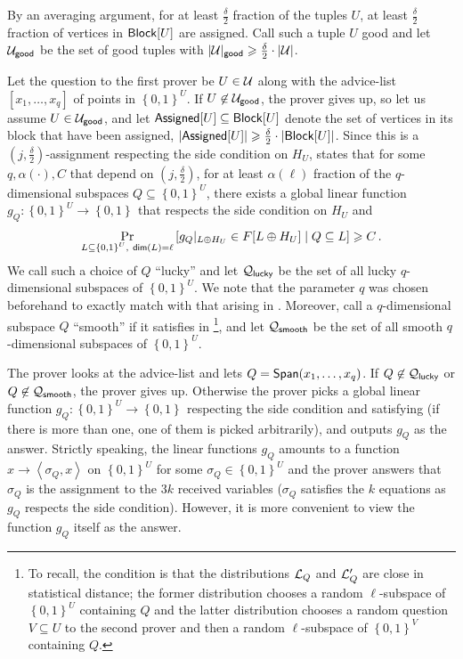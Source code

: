 \documentclass{toc}
\newcommand\set[1]{{\left\{ #1 \right\}}}
\newcommand\Prob[2]{{\Pr_{#1}\left[ {#2} \right]}}
\newcommand\power[1]{\set{0,1}^{#1}}
\newcommand*\xor{\mathbin{\oplus}}
\renewcommand\geq{\geqslant}
\begin{document}
By an averaging argument, for at least $\frac{\delta}{2}$ fraction of the tuples $U$,
at least $\frac{\delta}{2}$ fraction of vertices in ${\sf Block}[U]$ are assigned. Call such a tuple $U$ good and let ${\cal U}_{\sf good}$ be
the set of good tuples with $|{\cal U}|_{\sf good} \geq \frac{\delta}{2} \cdot |{\cal U}|$.

Let the question to the first prover be $U \in {\cal U}$ along with the advice-list  $[x_1, \ldots, x_q]$ of points in $\power{U}$. If
$U \not\in {\cal U}_{\sf good}$, the prover gives up, so let us assume $U \in {\cal U}_{\sf good}$, and
let ${\sf Assigned}[U] \subseteq {\sf Block}[U]$ denote the set of vertices in its block that have been assigned,
$|{\sf Assigned}[U]| \geq \frac{\delta}{2} \cdot |{\sf Block}[U]|$. Since this is a $(j,\frac{\delta}{2})$-assignment respecting the
side condition on $H_U$,  states that for some $q, \alpha(\cdot), C$ that depend on $(j,\frac{\delta}{2})$, for
at least $\alpha(\ell)$ fraction of the $q$-dimensional subspaces $Q \subseteq \power{U}$,
there exists a global linear
function $g_Q : \power{U} \to \power{}$ that respects the side condition on $H_U$ and
\begin{equation} \label{eqn:soundness-1}  
  \Prob{L \subseteq \power{U}, ~{\sf dim}(L)=\ell}{g_Q|_{L\xor H_U}  \in F[L\xor H_U] \mid Q \subseteq L}\geqslant C\,.%
\end{equation}
We call such a choice of $Q$ ``lucky'' and let ${\cal Q}_{\sf lucky}$ be the set of all lucky $q$-dimensional subspaces of
$\power{U}$.  We note that the parameter $q$ was chosen beforehand to exactly match with that arising in .
Moreover, call a $q$-dimensional subspace $Q$ ``smooth'' if it satisfies  in \footnote{To recall,
the condition is that the distributions ${\cal L}_Q$ and ${\cal L}'_Q$ are close in statistical distance; the former distribution
chooses a random $\ell$-subspace of $\power{U}$ containing $Q$ and the latter distribution chooses a random question $V \subseteq U$ to the
second prover and then a random $\ell$-subspace of $\power{V}$ containing $Q$.}, and let ${\cal Q}_{\sf smooth}$ be the set of all smooth
$q$-dimensional subspaces of
$\power{U}$.

The prover looks at the advice-list and lets $Q = {\sf Span}(x_1,\ldots, x_q)$. If $Q \not\in {\cal Q}_{\sf lucky}$ or
$Q \not\in {\cal Q}_{\sf smooth}$,  the prover
gives up. Otherwise the prover picks a global linear function $g_Q:\power{U} \to \power{}$ respecting the side condition and satisfying 
(if there is more than one, one of them is picked arbitrarily), and outputs $g_Q$ as the answer. Strictly speaking,
 the linear functions $g_Q$  amounts to a function
$x \to \left< \sigma_Q, x\right> $ on $\power{U}$ for some $\sigma_Q \in \power{U}$ and the prover answers that $\sigma_Q$ is the
assignment to the $3k$ received variables ($\sigma_Q$ satisfies the $k$ equations as $g_Q$ respects the side condition). However, it
is more convenient to view the function $g_Q$ itself as the answer.
\end{document}
